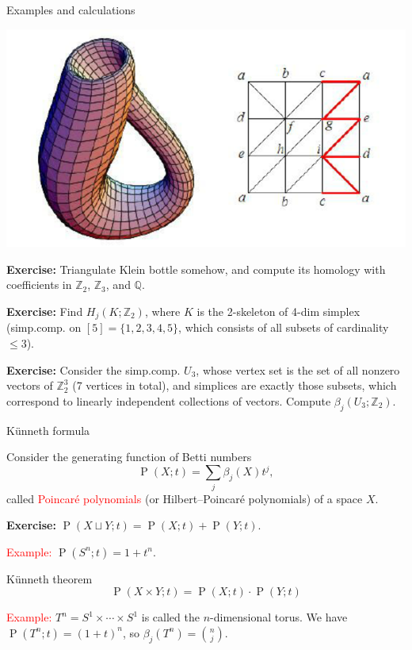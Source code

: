 \documentclass[10pt]{beamer}
\DeclareMathOperator{\Hilb}{P}
\newcommand{\Zo}{\mathbb{Z}}
\newcommand{\Qo}{\mathbb{Q}}
\newcommand{\Zt}{\Zo_2}
\begin{document}
\begin{frame}{Examples and calculations}

\begin{center}
\includegraphics[scale = 0.15]{pictures/KleinBottle.png}
\end{center}

\textbf{Exercise:} Triangulate Klein bottle somehow, and compute its homology with coefficients in $\Zt$, $\Zo_3$, and $\Qo$.

\textbf{Exercise:} Find $H_j(K;\Zt)$, where $K$ is the 2-skeleton of 4-dim simplex (simp.comp. on $[5]=\{1,2,3,4,5\}$, which consists of all subsets of cardinality $\leqslant 3$).

\textbf{Exercise:} Consider the simp.comp. $U_3$, whose vertex set is the set of all nonzero vectors of $\Zt^3$ (7 vertices in total), and simplices are exactly those subsets, which correspond to linearly independent collections of vectors. Compute $\beta_j(U_3;\Zt)$.
\end{frame}

\begin{frame}{K\"{u}nneth formula}

Consider the generating function of Betti numbers
\[
\Hilb(X;t)=\sum_j \beta_j(X)t^j,
\]
called \textcolor{red}{Poincar\'{e} polynomials} (or Hilbert--Poincar\'{e} polynomials) of a space $X$.\pause

\textbf{Exercise:} $\Hilb(X\sqcup Y;t)=\Hilb(X;t)+\Hilb(Y;t)$.\pause

\textcolor{red}{Example:} $\Hilb(S^n;t)=1+t^n$.\pause

\begin{block}{K\"{u}nneth theorem}
\[
\Hilb(X\times Y;t)=\Hilb(X;t)\cdot \Hilb(Y;t)
\]
\end{block}
\pause

\textcolor{red}{Example:} $T^n=S^1\times\cdots\times S^1$ is called the $n$-dimensional torus. We have $\Hilb(T^n;t)=(1+t)^n$, so $\beta_j(T^n)={n\choose j}$.
\end{frame}
\end{document}
